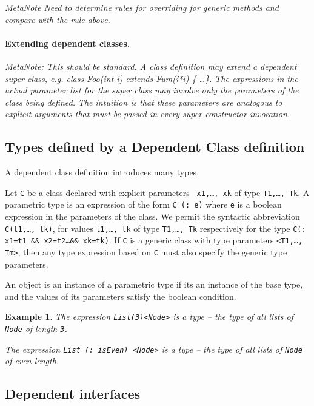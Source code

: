 \documentclass[fullpage]{article}
\newtheorem{example}{Example}[section]
\begin{document}
{\em MetaNote Need to determine rules for overriding for generic
methods and compare with the rule above.}

\paragraph{Extending dependent classes.}

{\em MetaNote: This should be standard. A class definition may extend
a dependent super class, e.g. class Foo(int i) extends Fum(i*i) \{
\ldots \}. The expressions in the actual parameter list for the super
class may involve only the parameters of the class being defined. The
intuition is that these parameters are analogous to explicit arguments
that must be passed in every super-constructor invocation.}

\subsection{Types defined by a Dependent Class definition}
A dependent class definition introduces many types.

Let {\tt C} be a class declared with explicit parameters {\tt
x1,\ldots, xk} of type {\tt T1,\ldots, Tk}.  A parametric type is an
expression of the form {\tt C (: e)} where {\tt e} is a boolean
expression in the parameters of the class. We permit the syntactic
abbreviation {\tt C(t1,\ldots, tk)}, for values {\tt t1,\ldots, tk} of
type {\tt T1,\ldots, Tk} respectively for the type {\tt C(: x1=t1 \&\&
x2=t2\ldots \&\& xk=tk)}.  If {\tt C} is a generic class with type
parameters {\tt <T1,\ldots, Tm>}, then any type expression based on
{\tt C} must also specify the generic type parameters.

An object is an instance of a parametric type if its an instance of
the base type, and the values of its parameters satisfy the boolean
condition. 

{}\begin{example} The expression {\tt List(3)<Node>} is a type -- the
type of all lists of {\tt Node} of length {\tt 3}. 

The expression {\tt List (: isEven) <Node>} is a type -- the type of all
lists of {\tt Node} of even length.
\end{example}

\subsection{Dependent interfaces}
\end{document}
